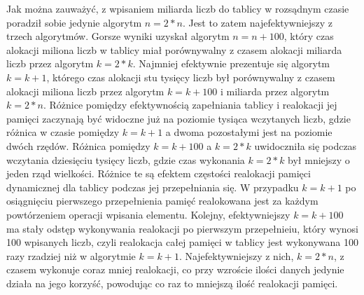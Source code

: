 \documentclass[10pt, a4paper]{article}
\begin{document}
\begin{flushleft}
Jak można zauważyć, z wpisaniem miliarda liczb do tablicy w rozsądnym czasie poradził sobie jedynie algorytm $n=2*n$. Jest to zatem najefektywniejszy z trzech algorytmów. Gorsze wyniki uzyskał algorytm $n=n+100$, który czas alokacji miliona liczb w tablicy miał porównywalny z czasem alokacji miliarda liczb przez algorytm $k=2*k$. Najmniej efektywnie prezentuje się algorytm $k=k+1$, którego czas alokacji stu tysięcy liczb był porównywalny z czasem alokacji miliona liczb przez algorytm $k=k+100$ i miliarda przez algorytm $k=2*n$. Różnice pomiędzy efektywnością zapełniania tablicy i realokacji jej pamięci zaczynają być widoczne już na poziomie tysiąca wczytanych liczb, gdzie różnica w czasie pomiędzy $k=k+1$ a dwoma pozostałymi jest na poziomie dwóch rzędów. Różnica pomiędzy $k=k+100$ a $k=2*k$ uwidoczniła się podczas wczytania dziesięciu tysięcy liczb, gdzie czas wykonania $k=2*k$ był mniejszy o jeden rząd wielkości. Różnice te są efektem częstości realokacji pamięci dynamicznej dla tablicy podczas jej przepełniania się. W przypadku $k=k+1$ po osiągnięciu pierwszego przepełnienia pamięć realokowana jest za każdym powtórzeniem operacji wpisania elementu. Kolejny, efektywniejszy $k=k+100$ ma stały odstęp wykonywania realokacji po pierwszym przepełnieiu, który wynosi 100 wpisanych liczb, czyli realokacja całej pamięci w tablicy jest wykonywana 100 razy rzadziej niż w algorytmie $k=k+1$. Najefektywniejszy z nich, $k=2*n$, z czasem wykonuje coraz mniej realokacji, co przy wzroście ilości danych jedynie działa na jego korzyść, powodując co raz to mniejszą ilość realokacji pamięci.  

\end{flushleft}
\end{document}
